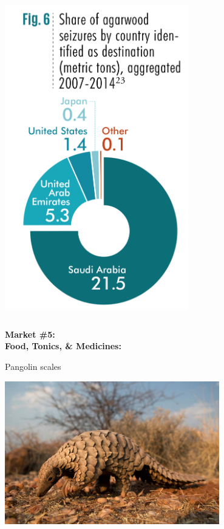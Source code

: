 \documentclass[10pt]{beamer}
\begin{document}
\begin{frame}[t]
\begin{columns}
		\begin{column}{0.5\textwidth}
			\begin{center}
				\includegraphics[width=0.6\textwidth]{figures/agarwood_illegal_import.png}
			\end{center}
		\end{column}
	\end{columns}
\end{frame}


\begin{frame}
	\begin{center}
		\Large{\textbf{\textcolor{myblue}{Market \#5:\\ Food, Tonics, \& Medicines:}}}\normalsize{}\\ 
		
		\vspace{0.25cm}
		
		Pangolin scales\\
		
		\vspace{0.5cm}
		
		\includegraphics[width=0.7\textwidth]{figures/pangolin.jpg}
	\end{center}
\end{frame}
\end{document}
